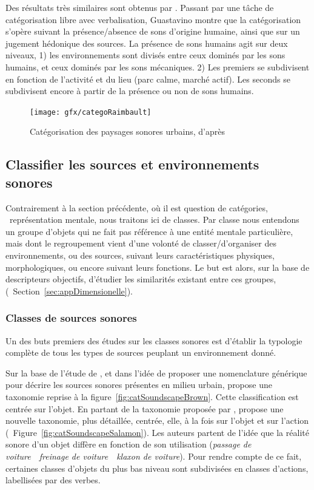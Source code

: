 Des résultats très similaires sont obtenus par \citep{guastavino2007categorization}. Passant par une tâche de catégorisation libre avec verbalisation, Guastavino montre que la catégorisation s'opère suivant la présence/absence de sons d'origine humaine, ainsi que sur un jugement hédonique des sources. La présence de sons humains agit sur deux niveaux, 1) les environnements sont divisés entre ceux dominés par les sons humains, et ceux dominés par les sons mécaniques. 2) Les premiers se subdivisent en fonction de l'activité et du lieu (parc calme, marché actif). Les seconds se subdivisent encore à partir de la présence ou non de sons humains.

\begin{figure}[t]
        \myfloatalign
        \texttt{[image: gfx/categoRaimbault]}
        \caption{Catégorisation des paysages sonores urbains, d'après \citep{raimbault2005urban}}\label{fig:catSoundscapeRaimbault}
\end{figure}

\subsection{Classifier les sources et environnements sonores}

Contrairement à la section précédente, où il est question de catégories, \ie~représentation mentale, nous traitons ici de classes. Par classe nous entendons un groupe d'objets qui ne fait pas référence à une entité mentale particulière, mais dont le regroupement vient d'une volonté de classer/d'organiser des environnements, ou des sources, suivant leurs caractéristiques physiques, morphologiques, ou encore suivant leurs fonctions. Le but est alors, sur la base de descripteurs objectifs, d'étudier les similarités existant entre ces groupes,(\cf~Section~\ref{sec:appDimensionelle}).


\subsubsection{Classes de sources sonores}

Un des buts premiers des études sur les classes sonores est d'établir la typologie complète de tous les types de sources peuplant un environnement donné.

Sur la base de l'étude de \citep{raimbault2005urban}, et dans l'idée de proposer une nomenclature générique pour décrire les sources sonores présentes en milieu urbain, \citep{brown2011towards} propose une taxonomie reprise à la figure~\ref{fig:catSoundscapeBrown}. Cette classification est centrée sur l'objet. En partant de la taxonomie proposée par \citep{brown2011towards}, \citep{Salamon14} propose une nouvelle taxonomie, plus détaillée, centrée, elle, à la fois sur l'objet et sur l'action (\cf~Figure~\ref{fig:catSoundscapeSalamon}). Les auteurs partent de l'idée que la réalité sonore d'un objet diffère en fonction de son utilisation (\emph{passage de voiture}~\vs~\emph{freinage de voiture}~\vs~\emph{klaxon de voiture}). Pour rendre compte de ce fait,  certaines classes d'objets du plus bas niveau sont subdivisées en classes d'actions, labellisées par des verbes.

